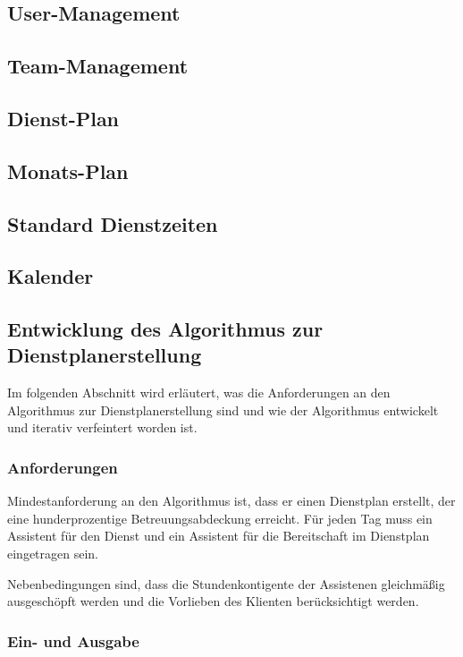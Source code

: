 \documentclass[12pt,a4paper,titlepage]{article} %
\begin{document}
\subsection{User-Management}
\subsection{Team-Management}
\subsection{Dienst-Plan}
\subsection{Monats-Plan}
\subsection{Standard Dienstzeiten}
\subsection{Kalender}

\subsection{Entwicklung des Algorithmus zur Dienstplanerstellung}
Im folgenden Abschnitt wird erläutert, was die Anforderungen an den Algorithmus zur Dienstplanerstellung sind und wie der Algorithmus entwickelt und iterativ verfeintert worden ist.

\subsubsection{Anforderungen}
Mindestanforderung an den Algorithmus ist, dass er einen Dienstplan erstellt, der eine hunderprozentige Betreuungsabdeckung erreicht. Für jeden Tag muss ein Assistent für den Dienst und ein Assistent für die Bereitschaft im Dienstplan eingetragen sein.

Nebenbedingungen sind, dass die Stundenkontigente %
der Assistenen gleichmäßig ausgeschöpft werden %
und die Vorlieben des Klienten berücksichtigt werden. %

\subsubsection{Ein- und Ausgabe}
\end{document}
